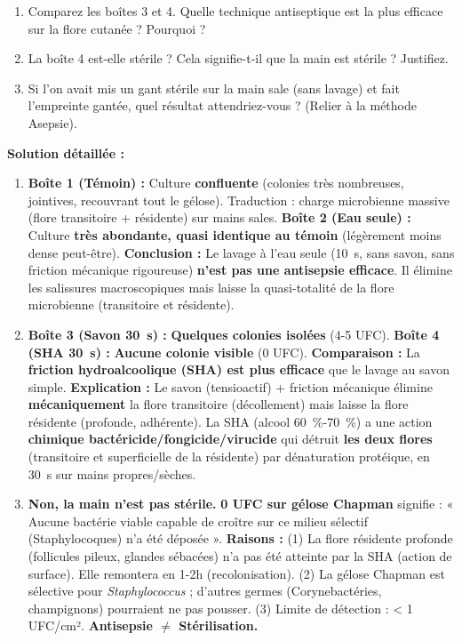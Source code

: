 \documentclass[11pt]{article}
\begin{document}
\begin{exoresolu}
\begin{enumerate}
        \item Comparez les boîtes 3 et 4. Quelle technique antiseptique est la plus efficace sur la flore cutanée ? Pourquoi ?
        \item La boîte 4 est-elle stérile ? Cela signifie-t-il que la main est stérile ? Justifiez.
        \item Si l'on avait mis un gant stérile sur la main sale (sans lavage) et fait l'empreinte gantée, quel résultat attendriez-vous ? (Relier à la méthode Asepsie).
    \end{enumerate}
    \tcblower
    \textbf{Solution détaillée :}
    \begin{enumerate}
        \item \textbf{Boîte 1 (Témoin) :} Culture \textbf{confluente} (colonies très nombreuses, jointives, recouvrant tout le gélose). Traduction : charge microbienne massive (flore transitoire + résidente) sur mains sales. \textbf{Boîte 2 (Eau seule) :} Culture \textbf{très abondante, quasi identique au témoin} (légèrement moins dense peut-être). \textbf{Conclusion :} Le lavage à l'eau seule (\SI{10}{\second}, sans savon, sans friction mécanique rigoureuse) \textbf{n'est pas une antisepsie efficace}. Il élimine les salissures macroscopiques mais laisse la quasi-totalité de la flore microbienne (transitoire et résidente).
        \item \textbf{Boîte 3 (Savon \SI{30}{\second}) :} \textbf{Quelques colonies isolées} (4-5 UFC). \textbf{Boîte 4 (SHA \SI{30}{\second}) :} \textbf{Aucune colonie visible} (0 UFC). \textbf{Comparaison :} La \textbf{friction hydroalcoolique (SHA) est plus efficace} que le lavage au savon simple. \textbf{Explication :} Le savon (tensioactif) + friction mécanique élimine \textbf{mécaniquement} la flore transitoire (décollement) mais laisse la flore résidente (profonde, adhérente). La SHA (alcool \SI{60}{\percent}-\SI{70}{\percent}) a une action \textbf{chimique bactéricide/fongicide/virucide} qui détruit \textbf{les deux flores} (transitoire et superficielle de la résidente) par dénaturation protéique, en \SI{30}{\second} sur mains propres/sèches.
        \item \textbf{Non, la main n'est pas stérile.} \textbf{0 UFC sur gélose Chapman} signifie : « Aucune bactérie viable capable de croître sur ce milieu sélectif (Staphylocoques) n'a été déposée ». \textbf{Raisons :} (1) La flore résidente profonde (follicules pileux, glandes sébacées) n'a pas été atteinte par la SHA (action de surface). Elle remontera en 1-2h (recolonisation). (2) La gélose Chapman est sélective pour \textit{Staphylococcus} ; d'autres germes (Corynebactéries, champignons) pourraient ne pas pousser. (3) Limite de détection : < 1 UFC/cm². \textbf{Antisepsie $\neq$ Stérilisation.}

\end{enumerate}
\end{exoresolu}
\end{document}
